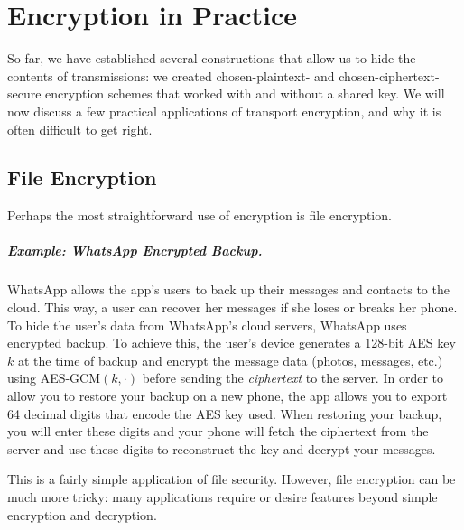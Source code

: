 \chapter{Encryption in Practice}

So far, we have established several constructions
that allow us to hide the contents of
transmissions: we created chosen-plaintext- 
and chosen-ciphertext-secure
encryption schemes that worked with and without
a shared key.
We will now discuss a few practical applications
of transport encryption, and why it is often difficult
to get right.


\section{File Encryption}
Perhaps the most straightforward use of encryption is file encryption.

\paragraph{Example: WhatsApp Encrypted Backup.}
WhatsApp allows the app's users to back up their 
messages and contacts to the cloud.
This way, a user can recover her messages 
if she loses or breaks her phone.
To hide the user's data from WhatsApp's cloud servers, WhatsApp
uses encrypted backup.
To achieve this, the user's device generates
a 128-bit AES key $k$ at the time of backup
and encrypt the message data
(photos, messages, etc.) using AES-GCM$(k, \cdot)$
before sending the \emph{ciphertext} to the
server. In order to allow you to restore your
backup on a new phone, the app allows you to
export 64 decimal digits that encode the AES key
used. When restoring your backup, you will enter
these digits and your phone will fetch the
ciphertext from the server and use these digits to
reconstruct the key and decrypt your messages.

This is a fairly simple application of file security. However, file encryption can be much more tricky: many applications require or desire features beyond simple encryption and decryption.

